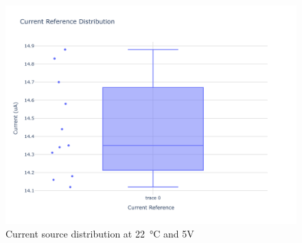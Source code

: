 \begin{figure}[ht]
	\centering
	\includegraphics[width=\textwidth]{images/Current_Reference_Distribution.png}
	\caption{Current source distribution at \qty{22}{\degreeCelsius} and 5V}
	\label{fig:current_source_distr}
\end{figure}
\clearpage

